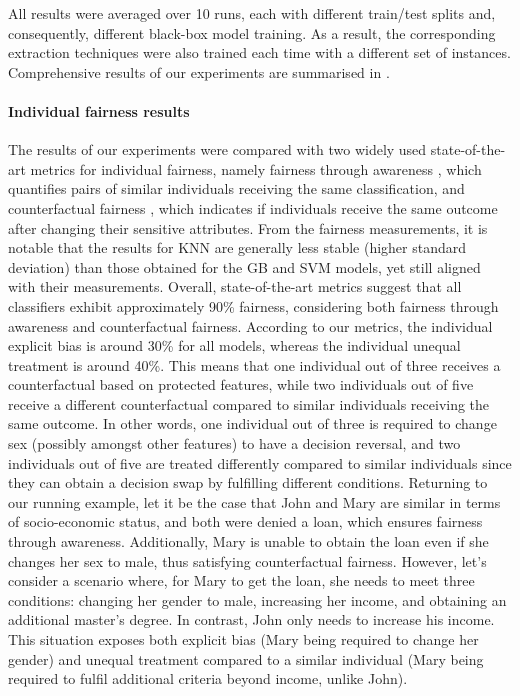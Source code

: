 \documentclass[letterpaper]{article} %
\begin{document}
All results were averaged over 10 runs, each with different train/test splits and, consequently, different black-box model training.
%
As a result, the corresponding extraction techniques were also trained each time with a different set of instances.
%
Comprehensive results of our experiments are summarised in .

\paragraph{Individual fairness results}
The results of our experiments were compared with two widely used state-of-the-art metrics for individual fairness, namely fairness through awareness \cite{10.1145/2090236.2090255}, which quantifies pairs of similar individuals receiving the same classification, and counterfactual fairness \cite{NIPS2017_a486cd07}, which indicates if individuals receive the same outcome after changing their sensitive attributes.
%
From the fairness measurements, it is notable that the results for KNN are generally less stable (higher standard deviation) than those obtained for the GB and SVM models, yet still aligned with their measurements.
%
Overall, state-of-the-art metrics suggest that all classifiers exhibit approximately 90\% fairness, considering both fairness through awareness and counterfactual fairness.
%
According to our metrics, the individual explicit bias is around 30\% for all models, whereas the individual unequal treatment is around 40\%.
%
This means that one individual out of three receives a counterfactual based on protected features, while two individuals out of five receive a different counterfactual compared to similar individuals receiving the same outcome.
%
In other words, one individual out of three is required to change sex (possibly amongst other features) to have a decision reversal, and two individuals out of five are treated differently compared to similar individuals since they can obtain a decision swap by fulfilling different conditions.
%
Returning to our running example, let it be the case that John and Mary are similar in terms of socio-economic status, and both were denied a loan, which ensures fairness through awareness. Additionally, Mary is unable to obtain the loan even if she changes her sex to male, thus satisfying counterfactual fairness. 
%
However, let's consider a scenario where, for Mary to get the loan, she needs to meet three conditions: changing her gender to male, increasing her income, and obtaining an additional master’s degree. In contrast, John only needs to increase his income. 
%
This situation exposes both explicit bias (Mary being required to change her gender) and unequal treatment compared to a similar individual (Mary being required to fulfil additional criteria beyond income, unlike John).
\end{document}
